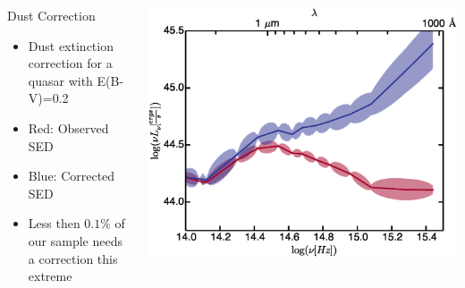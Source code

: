 \documentclass[landscape,9pt]{beamer}
\begin{document}
\begin{frame}
	\begin{columns}
		\begin{column}{.35\textwidth}
			\begin{block}{Dust Correction}
			\begin{itemize}
				\item Dust extinction correction for a quasar with E(B-V)=0.2
				\item Red: Observed SED
				\item Blue: Corrected SED
				\item Less then $0.1\%$ of our sample needs a correction this extreme
			\end{itemize}
			\end{block}
		\end{column}
		\begin{column}{.75\textwidth}
			\includegraphics[width=\textwidth]{../images/BH/f2}
		\end{column}
	\end{columns}
\end{frame}
\end{document}
